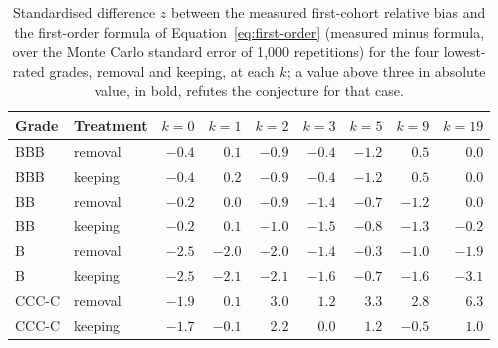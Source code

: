 \begin{table}[htbp]
\centering
\setlength{\tabcolsep}{3.5pt}
\footnotesize
\caption{Standardised difference $z$ between the measured first-cohort relative bias and the first-order formula of Equation~\eqref{eq:first-order} (measured minus formula, over the Monte Carlo standard error of 1{,}000 repetitions) for the four lowest-rated grades, removal and keeping, at each $k$; a value above three in absolute value, in bold, refutes the conjecture for that case.}
\label{tab:conjecture}
\begin{tabular}{llrrrrrrr}
\toprule
Grade & Treatment & $k=0$ & $k=1$ & $k=2$ & $k=3$ & $k=5$ & $k=9$ & $k=19$ \\
\midrule
\relax BBB & \relax removal & $-0.4$ & $0.1$ & $-0.9$ & $-0.4$ & $-1.2$ & $0.5$ & $0.0$ \\
\relax BBB & \relax keeping & $-0.4$ & $0.2$ & $-0.9$ & $-0.4$ & $-1.2$ & $0.5$ & $0.0$ \\
\relax BB & \relax removal & $-0.2$ & $0.0$ & $-0.9$ & $-1.4$ & $-0.7$ & $-1.2$ & $0.0$ \\
\relax BB & \relax keeping & $-0.2$ & $0.1$ & $-1.0$ & $-1.5$ & $-0.8$ & $-1.3$ & $-0.2$ \\
\relax B & \relax removal & $-2.5$ & $-2.0$ & $-2.0$ & $-1.4$ & $-0.3$ & $-1.0$ & $-1.9$ \\
\relax B & \relax keeping & $-2.5$ & $-2.1$ & $-2.1$ & $-1.6$ & $-0.7$ & $-1.6$ & $\mathbf{-3.1}$ \\
\relax CCC-C & \relax removal & $-1.9$ & $0.1$ & $\mathbf{3.0}$ & $1.2$ & $\mathbf{3.3}$ & $2.8$ & $\mathbf{6.3}$ \\
\relax CCC-C & \relax keeping & $-1.7$ & $-0.1$ & $2.2$ & $0.0$ & $1.2$ & $-0.5$ & $1.0$ \\
\bottomrule
\end{tabular}
\end{table}
